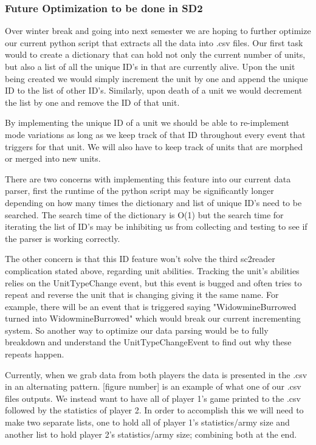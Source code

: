 \documentclass[a4paper,12pt]{report}
\begin{document}
\subsubsection{Future Optimization to be done in SD2}
Over winter break and going into next semester we are hoping to further optimize our current python script that extracts all the data into .csv files. Our first task would to create a dictionary that can hold not only the current number of units, but also a list of all the unique ID’s in that are currently alive. Upon the unit being created we would simply increment the unit by one and append the unique ID to the list of other ID’s. Similarly, upon death of a unit we would decrement the list by one and remove the ID of that unit.

By implementing the unique ID of a unit we should be able to re-implement mode variations as long as we keep track of that ID throughout every event that triggers for that unit. We will also have to keep track of units that are morphed or merged into new units.

There are two concerns with implementing this feature into our current data parser, first the runtime of the python script may be significantly longer depending on how many times the dictionary and list of unique ID’s need to be searched. The search time of the dictionary is O(1) but the search time for iterating the list of ID’s may be inhibiting us from collecting and testing to see if the parser is working correctly.

The other concern is that this ID feature won’t solve the third sc2reader complication stated above, regarding unit abilities. Tracking the unit’s abilities relies on the UnitTypeChange event, but this event is bugged and often tries to repeat and reverse the unit that is changing giving it the same name. For example, there will be an event that is triggered saying "WidowmineBurrowed turned into WidowmineBurrowed" which would break our current incrementing system. So another way to optimize our data parsing would be to fully breakdown and understand the UnitTypeChangeEvent to find out why these repeats happen.

Currently, when we grab data from both players the data is presented in the .csv in an alternating pattern. [figure number] is an example of what one of our .csv files outputs. We instead want to have all of player 1’s game printed to the .csv followed by the statistics of player 2. In order to accomplish this we will  need to make two separate lists, one to hold all of player 1’s statistics/army size and another list to hold player 2’s statistics/army size; combining both at the end.
\end{document}
